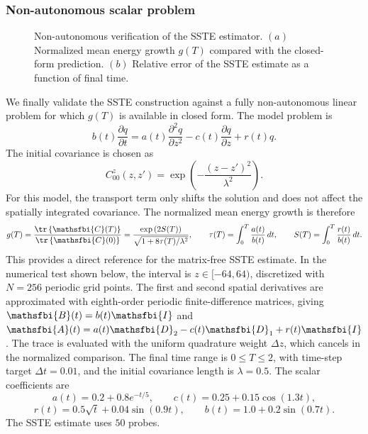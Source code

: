 \subsubsection{Non-autonomous scalar problem}
\label{sec:appendix_verification_nonautonomous}
\begin{figure}[!b]
    \centering
    \begin{minipage}[t]{0.48\textwidth}
        \centering
        \vspace{0pt}
        
    \end{minipage}
    \hfill
    \begin{minipage}[t]{0.48\textwidth}
        \centering
        \vspace{0pt}
        
    \end{minipage}
    \caption{Non-autonomous verification of the SSTE estimator. \((a)\) Normalized mean energy growth \(g(T)\) compared with the closed-form prediction. \((b)\) Relative error of the SSTE estimate as a function of final time.}
    \label{fig:nonautonomous_hutchpp}
\end{figure}
We finally validate the SSTE construction against a fully non-autonomous linear problem for which \(g(T)\) is available in closed form. The model problem is
\begin{equation}
  b(t)\frac{\partial q}{\partial t}
  =
  a(t)\frac{\partial^2 q}{\partial z^2}
  -
  c(t)\frac{\partial q}{\partial z}
  +
  r(t)q .
\end{equation}
The initial covariance is chosen as
\begin{equation}
  C_{00}^{z}(z,z')
  =
  \exp\left(
    -\frac{(z-z')^2}{\lambda^2}
  \right).
\end{equation}
For this model, the transport term only shifts the solution and does not affect the spatially integrated covariance. The normalized mean energy growth is therefore
\begin{equation}
  g(T)
  =
  \frac{\tr\left\{\mathsfbi{C}(T)\right\}}{\tr\left\{\mathsfbi{C}(0)\right\}}
  =
  \frac{
    \exp\left(2S(T)\right)
  }{
    \sqrt{1+8\tau(T)/\lambda^2}
  },
  \qquad
  \tau(T)=\int_0^T \frac{a(t)}{b(t)}\,dt,
  \qquad
  S(T)=\int_0^T \frac{r(t)}{b(t)}\,dt .
\end{equation}
This provides a direct reference for the matrix-free SSTE estimate. In the numerical test shown below, the interval is \(z\in[-64,64)\), discretized with \(N=256\) periodic grid points. The first and second spatial derivatives are approximated with eighth-order periodic finite-difference matrices, giving \(\mathsfbi{B}(t)=b(t)\mathsfbi{I}\) and \(\mathsfbi{A}(t)=a(t)\mathsfbi{D}_2-c(t)\mathsfbi{D}_1+r(t)\mathsfbi{I}\). The trace is evaluated with the uniform quadrature weight \(\Delta z\), which cancels in the normalized comparison. The final time range is \(0\le T\le 2\), with time-step target \(\Delta t=0.01\), and the initial covariance length is \(\lambda=0.5\). The scalar coefficients are
\begin{equation}
  a(t)=0.2+0.8e^{-t/5},\qquad
  c(t)=0.25+0.15\cos(1.3t),
\end{equation}
\begin{equation}
  r(t)=0.5\sqrt{t}+0.04\sin(0.9t),\qquad
  b(t)=1.0+0.2\sin(0.7t).
\end{equation}
The SSTE estimate uses \(50\) probes.
